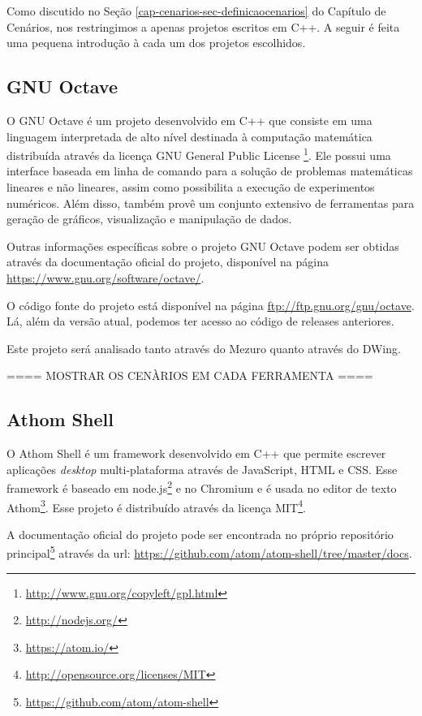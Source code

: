 Como discutido no Seção \ref{cap-cenarios-sec-definicaocenarios} do Capítulo de Cenários, nos restringimos a apenas projetos escritos em C++. A seguir é feita uma pequena introdução à cada um dos projetos escolhidos.

\subsection{GNU Octave}
\label{section-octave}

O GNU Octave é um projeto desenvolvido em C++ que consiste em uma linguagem interpretada de alto nível destinada à computação matemática distribuída através da licença GNU General Public License \footnote{\url{http://www.gnu.org/copyleft/gpl.html}}. Ele possui uma interface baseada em linha de comando para a solução de problemas matemáticas lineares e não lineares, assim como possibilita a execução de experimentos numéricos. Além disso, também provê um conjunto extensivo de ferramentas para geração de gráficos, visualização e manipulação de dados.

Outras informações específicas sobre o projeto GNU Octave podem ser obtidas através da documentação oficial do projeto, disponível na página \url{https://www.gnu.org/software/octave/}.

O código fonte do projeto está disponível na página \url{ftp://ftp.gnu.org/gnu/octave}. Lá, além da versão atual, podemos ter acesso ao código de releases anteriores.

Este projeto será analisado tanto através do Mezuro quanto através do DWing.


==== MOSTRAR OS CENÀRIOS EM CADA FERRAMENTA ====


\subsection{Athom Shell}
\label{section-athom}

O Athom Shell é um framework desenvolvido em C++ que permite escrever aplicações \emph{desktop} multi-plataforma através de JavaScript, HTML e CSS. Esse framework é baseado em node.js\footnote{\url{http://nodejs.org/}} e no Chromium e é usada no editor de texto Athom\footnote{\url{https://atom.io/}}. Esse projeto é distribuído através da licença MIT\footnote{\url{http://opensource.org/licenses/MIT}}.

A documentação oficial do projeto pode ser encontrada no próprio repositório principal\footnote{\url{https://github.com/atom/atom-shell}} através da url: \url{https://github.com/atom/atom-shell/tree/master/docs}.

